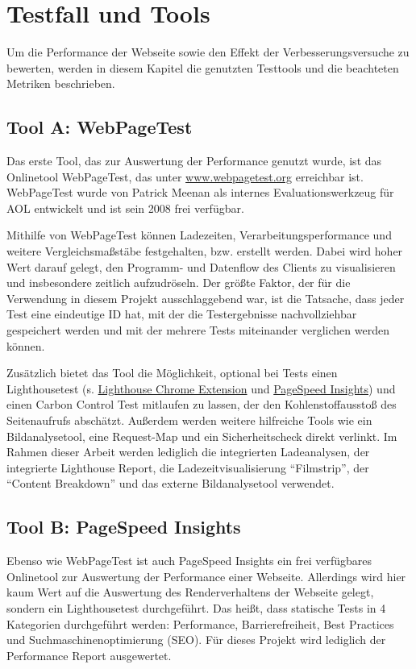 \documentclass[11pt,a4paper]{article}
\begin{document}
\section{Testfall und Tools}
Um die Performance der Webseite sowie den Effekt der Verbesserungsversuche zu bewerten, werden in diesem Kapitel die genutzten Testtools und die beachteten Metriken beschrieben.

\subsection{Tool A: WebPageTest}\label{subsec:WebPageTest}
Das erste Tool, das zur Auswertung der Performance genutzt wurde, ist das Onlinetool WebPageTest, das unter \href{https://www.webpagetest.org}{www.webpagetest.org} erreichbar ist.
WebPageTest wurde von Patrick Meenan als internes Evaluationswerkzeug für AOL entwickelt und ist sein 2008 frei verfügbar.

Mithilfe von WebPageTest können Ladezeiten, Verarbeitungsperformance und weitere Vergleichsmaßstäbe festgehalten, bzw. erstellt werden.
Dabei wird hoher Wert darauf gelegt, den Programm- und Datenflow des Clients zu visualisieren und insbesondere zeitlich aufzudröseln.
Der größte Faktor, der für die Verwendung in diesem Projekt ausschlaggebend war, ist die Tatsache, dass jeder Test eine eindeutige ID hat, mit der die Testergebnisse nachvollziehbar gespeichert werden und mit der mehrere Tests miteinander verglichen werden können.

Zusätzlich bietet das Tool die Möglichkeit, optional bei Tests einen Lighthousetest (s. \hyperref[subsec:Lighthouse]{Lighthouse Chrome Extension} und \hyperref[subsec:PageSpeed]{PageSpeed Insights}) und einen Carbon Control Test mitlaufen zu lassen, der den Kohlenstoffausstoß des Seitenaufrufs abschätzt.
Außerdem werden weitere hilfreiche Tools wie ein Bildanalysetool, eine Request-Map und ein Sicherheitscheck direkt verlinkt.
Im Rahmen dieser Arbeit werden lediglich die integrierten Ladeanalysen, der integrierte Lighthouse Report, die Ladezeitvisualisierung \enquote{Filmstrip}, der \enquote{Content Breakdown} und das externe Bildanalysetool verwendet.

\subsection{Tool B: PageSpeed Insights}\label{subsec:PageSpeed}
Ebenso wie WebPageTest ist auch PageSpeed Insights ein frei verfügbares Onlinetool zur Auswertung der Performance einer Webseite.
Allerdings wird hier kaum Wert auf die Auswertung des Renderverhaltens der Webseite gelegt, sondern ein Lighthousetest durchgeführt. Das heißt, dass statische Tests in 4 Kategorien durchgeführt werden: Performance, Barrierefreiheit, Best Practices und Suchmaschinenoptimierung (SEO).
Für dieses Projekt wird lediglich der Performance Report ausgewertet.
\end{document}
